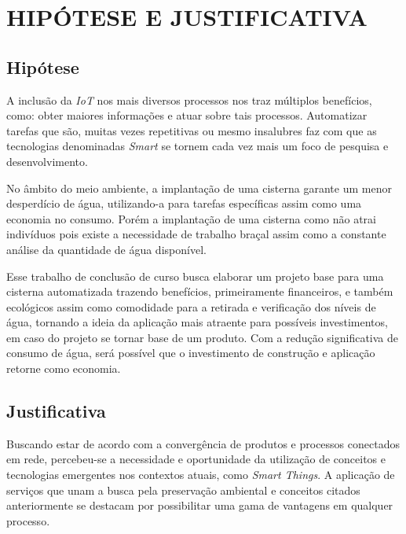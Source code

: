 
\chapter{HIPÓTESE E JUSTIFICATIVA}
\label{chap:hipoteseejustificativa}

\section{Hipótese}
\label{sec:hipotese}

A inclusão da \textit{IoT} nos mais diversos processos nos traz múltiplos benefícios, como: obter maiores informações e atuar sobre tais processos. Automatizar tarefas que são, muitas vezes repetitivas ou mesmo insalubres faz com que as tecnologias denominadas \textit{Smart} se tornem cada vez mais um foco de pesquisa e desenvolvimento. 

No âmbito do meio ambiente, a implantação de uma cisterna garante um menor desperdício de água, utilizando-a para tarefas específicas assim como uma economia no consumo. Porém a implantação de uma cisterna como não atrai indivíduos pois existe a necessidade de trabalho braçal assim como a constante análise da quantidade de água disponível.

Esse trabalho de conclusão de curso busca elaborar um projeto base para uma cisterna automatizada trazendo benefícios, primeiramente financeiros,  e também ecológicos assim como comodidade para a retirada e verificação dos níveis de água, tornando a ideia da aplicação mais atraente para possíveis investimentos, em caso do projeto se tornar base de um produto. Com a redução significativa de consumo de água, será possível que o investimento de construção e aplicação retorne como economia.

\section{Justificativa}
\label{sec:justificativa}

Buscando estar de acordo com a convergência de produtos e processos conectados em rede, percebeu-se a necessidade e oportunidade da utilização de conceitos e tecnologias emergentes nos contextos atuais, como \textit{Smart Things}. A aplicação de serviços que unam a busca pela preservação ambiental e conceitos citados anteriormente se destacam por possibilitar uma gama de vantagens em qualquer processo.

